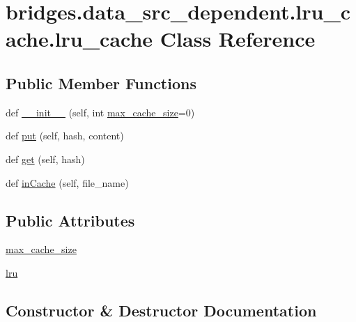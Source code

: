 \hypertarget{classbridges_1_1data__src__dependent_1_1lru__cache_1_1lru__cache}{}\section{bridges.\+data\+\_\+src\+\_\+dependent.\+lru\+\_\+cache.\+lru\+\_\+cache Class Reference}
\label{classbridges_1_1data__src__dependent_1_1lru__cache_1_1lru__cache}
\subsection*{Public Member Functions}
\begin{DoxyCompactItemize}
\item 
def \mbox{\hyperlink{classbridges_1_1data__src__dependent_1_1lru__cache_1_1lru__cache_ad439c4fef00138ce68e15fdab176b43b}{\+\_\+\+\_\+init\+\_\+\+\_\+}} (self, int \mbox{\hyperlink{classbridges_1_1data__src__dependent_1_1lru__cache_1_1lru__cache_a87a170ed62886de32e1bbf0d9ac05cfd}{max\+\_\+cache\+\_\+size}}=0)
\item 
def \mbox{\hyperlink{classbridges_1_1data__src__dependent_1_1lru__cache_1_1lru__cache_a98b97dd34aeaec0856bbc560cbac2866}{put}} (self, hash, content)
\item 
def \mbox{\hyperlink{classbridges_1_1data__src__dependent_1_1lru__cache_1_1lru__cache_a808ebb43936c26cae242752509e3e772}{get}} (self, hash)
\item 
def \mbox{\hyperlink{classbridges_1_1data__src__dependent_1_1lru__cache_1_1lru__cache_abfd53102b85993476f3dc75416811761}{in\+Cache}} (self, file\+\_\+name)
\end{DoxyCompactItemize}
\subsection*{Public Attributes}
\begin{DoxyCompactItemize}
\item 
\mbox{\hyperlink{classbridges_1_1data__src__dependent_1_1lru__cache_1_1lru__cache_a87a170ed62886de32e1bbf0d9ac05cfd}{max\+\_\+cache\+\_\+size}}
\item 
\mbox{\hyperlink{classbridges_1_1data__src__dependent_1_1lru__cache_1_1lru__cache_a2568c6b5de855a1ad90f876276b8cf49}{lru}}
\end{DoxyCompactItemize}


\subsection{Constructor \& Destructor Documentation}
\mbox{\label{classbridges_1_1data__src__dependent_1_1lru__cache_1_1lru__cache_ad439c4fef00138ce68e15fdab176b43b}} 
